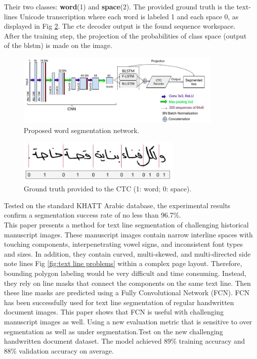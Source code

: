 \begin{itemize}[labelindent=1em,labelsep=0.25cm,leftmargin=*]
        Their two classes: \textbf{word}(1) and \textbf{space}(2). The
        provided ground truth is the text-lines Unicode transcription
        where each word is labeled 1 and each space 0, as displayed in Fig \ref{fig:word_seg}. The \acrshort{ctc} decoder output is the found sequence workspace. After the training step, the projection of the probabilities of class space (output of the \acrshort{blstm}) is made on the image.
        \begin{figure}[!htb]
        \centering
        \includegraphics[width=10cm]{images/seg_network.png}
        \caption{Proposed word segmentation network.}
        \label{fig:seg_network}
        \end{figure}
        
        \begin{figure}[!htb]
        \centering
        \includegraphics[width=8cm]{images/word_seg.png}
        \caption{Ground truth provided to the CTC (1: word; 0: space).}
        \label{fig:word_seg}
        \end{figure}
    
 \end{itemize}
 
Tested on the standard KHATT Arabic database, the experimental results confirm a segmentation success rate of no less than 96.7\%. \\

This paper \cite{FCN} presents a method for text line segmentation
of challenging historical manuscript images. These manuscript images contain narrow interline spaces with touching components, interpenetrating vowel signs, and inconsistent font types and sizes. In addition, they contain curved, multi-skewed, and multi-directed side note lines Fig \ref{fig:text line problems} within a complex page layout. Therefore, bounding polygon labeling would be very difficult and time consuming. Instead, they rely on line masks that connect the components on the same text line. Then these line masks are predicted using a Fully Convolutional Network (FCN). FCN has been successfully used for text line segmentation of regular handwritten document images. This paper shows that FCN is useful with challenging manuscript images as well. Using a new evaluation metric that is sensitive to over segmentation as well as under segmentation.Test on the new challenging handwritten document dataset. The model achieved 89\% training accuracy and 88\% validation accuracy on average.

